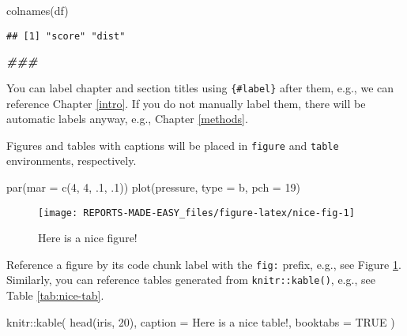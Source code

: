 \documentclass[
]{book}
\newenvironment{Shaded}{\begin{snugshade}}{\end{snugshade}}
\newcommand{\AttributeTok}[1]{\textcolor[rgb]{0.77,0.63,0.00}{#1}}
\newcommand{\ConstantTok}[1]{\textcolor[rgb]{0.00,0.00,0.00}{#1}}
\newcommand{\DecValTok}[1]{\textcolor[rgb]{0.00,0.00,0.81}{#1}}
\newcommand{\DocumentationTok}[1]{\textcolor[rgb]{0.56,0.35,0.01}{\textbf{\textit{#1}}}}
\newcommand{\FunctionTok}[1]{\textcolor[rgb]{0.00,0.00,0.00}{#1}}
\newcommand{\NormalTok}[1]{#1}
\newcommand{\SpecialCharTok}[1]{\textcolor[rgb]{0.00,0.00,0.00}{#1}}
\newcommand{\StringTok}[1]{\textcolor[rgb]{0.31,0.60,0.02}{#1}}
\begin{document}
\begin{Shaded}
\begin{Highlighting}[]
\FunctionTok{colnames}\NormalTok{(df)}
\end{Highlighting}
\end{Shaded}

\begin{verbatim}
## [1] "score" "dist"
\end{verbatim}

\begin{Shaded}
\begin{Highlighting}[]
\DocumentationTok{\#\#\# }
\end{Highlighting}
\end{Shaded}

You can label chapter and section titles using \texttt{\{\#label\}} after them, e.g., we can reference Chapter \ref{intro}. If you do not manually label them, there will be automatic labels anyway, e.g., Chapter \ref{methods}.

Figures and tables with captions will be placed in \texttt{figure} and \texttt{table} environments, respectively.

\begin{Shaded}
\begin{Highlighting}[]
\FunctionTok{par}\NormalTok{(}\AttributeTok{mar =} \FunctionTok{c}\NormalTok{(}\DecValTok{4}\NormalTok{, }\DecValTok{4}\NormalTok{, .}\DecValTok{1}\NormalTok{, .}\DecValTok{1}\NormalTok{))}
\FunctionTok{plot}\NormalTok{(pressure, }\AttributeTok{type =} \StringTok{\textquotesingle{}b\textquotesingle{}}\NormalTok{, }\AttributeTok{pch =} \DecValTok{19}\NormalTok{)}
\end{Highlighting}
\end{Shaded}

\begin{figure}

{\centering \texttt{[image: REPORTS-MADE-EASY\_files/figure-latex/nice-fig-1]} 

}

\caption{Here is a nice figure!}\label{fig:nice-fig}
\end{figure}

Reference a figure by its code chunk label with the \texttt{fig:} prefix, e.g., see Figure \ref{fig:nice-fig}. Similarly, you can reference tables generated from \texttt{knitr::kable()}, e.g., see Table \ref{tab:nice-tab}.

\begin{Shaded}
\begin{Highlighting}[]
\NormalTok{knitr}\SpecialCharTok{::}\FunctionTok{kable}\NormalTok{(}
  \FunctionTok{head}\NormalTok{(iris, }\DecValTok{20}\NormalTok{), }\AttributeTok{caption =} \StringTok{\textquotesingle{}Here is a nice table!\textquotesingle{}}\NormalTok{,}
  \AttributeTok{booktabs =} \ConstantTok{TRUE}
\NormalTok{)}
\end{Highlighting}
\end{Shaded}
\end{document}
